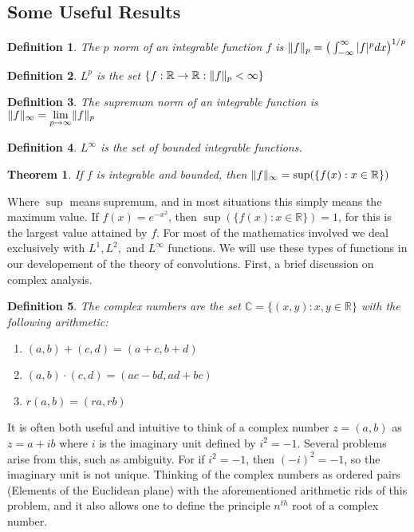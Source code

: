 \documentclass{article}
\theoremstyle{mystyle}
\newtheorem{theorem}{Theorem}[section]
\newtheorem{definition}{Definition}[section]
\DeclarePairedDelimiter\norm{\lVert}{\rVert}
\begin{document}
\subsection{Some Useful Results}
\begin{definition}
The ${p}$ norm of an integrable function $f$ is $\norm{f}_{p} = \big(\int_{-\infty}^{\infty}|f|^{p}dx\big)^{1/p}$
\end{definition}
\begin{definition}
$L^{p}$ is the set $\{f:\mathbb{R}\rightarrow \mathbb{R}:\norm{f}_{p}<\infty\}$
\end{definition}
\begin{definition}
The supremum norm of an integrable function is $\norm{f}_{\infty} = \underset{p\rightarrow \infty}{\lim}\norm{f}_{p}$
\end{definition}
\begin{definition}
$L^{\infty}$ is the set of bounded integrable functions.
\end{definition}
\begin{theorem}
If $f$ is integrable and bounded, then $\norm{f}_{\infty} = \sup(\{f(x):x\in\mathbb{R}\})$
\end{theorem}
Where $\sup$ means supremum, and in most situations this simply means the maximum value. If $f(x) = e^{-x^2}$, then $\sup(\{f(x):x\in\mathbb{R}\}) = 1$, for this is the largest value attained by $f$. For most of the mathematics involved we deal exclusively with $L^{1},L^{2},$ and $L^{\infty}$ functions. We will use these types of functions in our developement of the theory of convolutions. First, a brief discussion on complex analysis.
\begin{definition}
The complex numbers are the set $\mathbb{C} = \{(x,y):x,y\in\mathbb{R}\}$ with the following arithmetic:
\begin{enumerate}
    \item $(a,b) + (c,d) = (a+c,b+d)$
    \item $(a,b)\cdot (c,d) = (ac - bd,ad+bc)$
    \item $r(a,b) = (ra,rb)$
\end{enumerate}
\end{definition}
It is often both useful and intuitive to think of a complex number $z=(a,b)$ as $z=a+ib$ where $i$ is the imaginary unit defined by $i^2 = -1$. Several problems arise from this, such as ambiguity. For if $i^2 = -1$, then $(-i)^2 = -1$, so the imaginary unit is not unique. Thinking of the complex numbers as ordered pairs (Elements of the Euclidean plane) with the aforementioned arithmetic rids of this problem, and it also allows one to define the principle $n^{th}$ root of a complex number.
\end{document}
